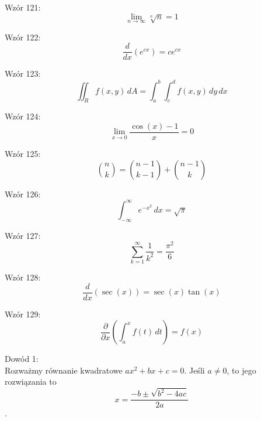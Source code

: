 \documentclass{article}
\begin{document}
Wzór 121:
\[ \lim_{{n \to \infty}} \sqrt[n]{n} = 1 \]

Wzór 122:
\[ \frac{d}{dx}\left(e^{cx}\right) = c e^{cx} \]

Wzór 123:
\[ \iint_R f(x,y) \,dA = \int_{a}^{b} \int_{c}^{d} f(x,y) \,dy\,dx \]

Wzór 124:
\[ \lim_{{x \to 0}} \frac{\cos(x) - 1}{x} = 0 \]

Wzór 125:
\[ \binom{n}{k} = \binom{n-1}{k-1} + \binom{n-1}{k} \]

Wzór 126:
\[ \int_{-\infty}^{\infty} e^{-x^2} \,dx = \sqrt{\pi} \]

Wzór 127:
\[ \sum_{k=1}^{\infty} \frac{1}{k^2} = \frac{\pi^2}{6} \]

Wzór 128:
\[ \frac{d}{dx}\left(\sec(x)\right) = \sec(x) \tan(x) \]

Wzór 129:
\[ \frac{\partial}{\partial x}\left(\int_{a}^{x} f(t) \,dt\right) = f(x) \]

Dowód 1:\\
Rozważmy równanie kwadratowe \( ax^2 + bx + c = 0 \). Jeśli \( a \neq 0 \), to jego rozwiązania to
\[ x = \frac{-b \pm \sqrt{b^2-4ac}}{2a} \].
\end{document}
